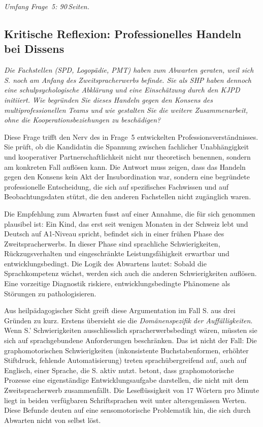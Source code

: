 \documentclass[ngerman, a4paper]{article}
\begin{document}
\textit{Umfang Frage~5: 90\,Seiten.}
 

 


\subsection{Kritische Reflexion: Professionelles Handeln bei Dissens}


\begin{tcolorbox}[colback=gray!5, colframe=gray!50, title=Weiterführende Diskurslinie]
\itshape
Die Fachstellen (SPD, Logopädie, PMT) haben zum Abwarten geraten, weil sich S.
noch am Anfang des Zweitspracherwerbs befinde. Sie als SHP haben dennoch eine
schulpsychologische Abklärung und eine Einschätzung durch den KJPD initiiert.
Wie begründen Sie dieses Handeln gegen den Konsens des multiprofessionellen
Teams und wie gestalten Sie die weitere Zusammenarbeit, ohne die
Kooperationsbeziehungen zu beschädigen?
\end{tcolorbox}

Diese Frage trifft den Nerv des in Frage~5 entwickelten Professionsverständnisses.
Sie prüft, ob die Kandidatin die Spannung zwischen fachlicher Unabhängigkeit und
kooperativer Partnerschaftlichkeit nicht nur theoretisch benennen, sondern am
konkreten Fall auflösen kann. Die Antwort muss zeigen, dass das Handeln gegen
den Konsens kein Akt der Insubordination war, sondern eine begründete
professionelle Entscheidung, die sich auf spezifisches Fachwissen und auf
Beobachtungsdaten stützt, die den anderen Fachstellen nicht zugänglich waren.

Die Empfehlung zum Abwarten fusst auf einer Annahme, die für sich genommen
plausibel ist: Ein Kind, das erst seit wenigen Monaten in der Schweiz lebt und
Deutsch auf A1-Niveau spricht, befindet sich in einer frühen Phase des
Zweitspracherwerbs. In dieser Phase sind sprachliche Schwierigkeiten,
Rückzugsverhalten und eingeschränkte Leistungsfähigkeit erwartbar und
entwicklungsbedingt. Die Logik des Abwartens lautet: Sobald die Sprachkompetenz
wächst, werden sich auch die anderen Schwierigkeiten auflösen. Eine vorzeitige
Diagnostik riskiere, entwicklungsbedingte Phänomene als Störungen zu
pathologisieren.

Aus heilpädagogischer Sicht greift diese Argumentation im Fall S. aus drei
Gründen zu kurz. Erstens übersieht sie die \textit{Domänenspezifik der
Auffälligkeiten}. Wenn S.' Schwierigkeiten ausschliesslich spracherwerbsbedingt
wären, müssten sie sich auf sprachgebundene Anforderungen beschränken. Das
ist nicht der Fall: Die graphomotorischen Schwierigkeiten (inkonsistente
Buchstabenformen, erhöhter Stiftdruck, fehlende Automatisierung) treten
sprachübergreifend auf, auch auf Englisch, einer Sprache, die S. aktiv nutzt.
\textcite[S.\,2--4]{sturm2016graphomotorik} betont, dass graphomotorische Prozesse eine eigenständige
Entwicklungsaufgabe darstellen, die nicht mit dem Zweitspracherwerb
zusammenfällt. Die Leseflüssigkeit von 17
Wörtern pro Minute liegt in beiden verfügbaren Schriftsprachen weit unter
altersgemässen Werten. Diese Befunde deuten auf eine sensomotorische
Problematik hin, die sich durch Abwarten nicht von selbst löst.
\end{document}
